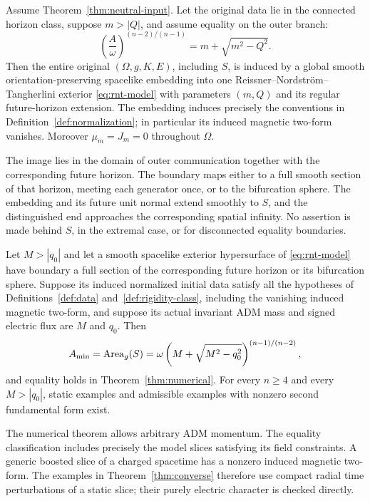 \begin{theorem}\label{thm:rigidity}
Assume Theorem~\ref{thm:neutral-input}. Let the original data lie in the connected horizon class, suppose $m>|Q|$, and assume equality on the outer branch:
\begin{equation}\label{eq:rigidity-equality}
 \left(\frac A\omega\right)^{(n-2)/(n-1)}
 =m+\sqrt{m^2-Q^2}.
\end{equation}
Then the entire original $(\Omega,g,K,E)$, including $S$, is induced by a global smooth orientation-preserving spacelike embedding into one Reissner--Nordstr\"om--Tangherlini exterior \eqref{eq:rnt-model} with parameters $(m,Q)$ and its regular future-horizon extension. The embedding induces precisely the conventions in Definition~\ref{def:normalization}; in particular its induced magnetic two-form vanishes. Moreover $\mu_m=J_m=0$ throughout $\Omega$.

The image lies in the domain of outer communication together with the corresponding future horizon. The boundary maps either to a full smooth section of that horizon, meeting each generator once, or to the bifurcation sphere. The embedding and its future unit normal extend smoothly to $S$, and the distinguished end approaches the corresponding spatial infinity. No assertion is made behind $S$, in the extremal case, or for disconnected equality boundaries.
\end{theorem}

\begin{theorem}\label{thm:converse}
Let $M>|q_0|$ and let a smooth spacelike exterior hypersurface of \eqref{eq:rnt-model} have boundary a full section of the corresponding future horizon or its bifurcation sphere. Suppose its induced normalized initial data satisfy all the hypotheses of Definitions~\ref{def:data} and~\ref{def:rigidity-class}, including the vanishing induced magnetic two-form, and suppose its actual invariant ADM mass and signed electric flux are $M$ and $q_0$. Then
\begin{equation}\label{eq:converse-area}
 A_{\min}=\operatorname{Area}_g(S)
 =\omega\left(M+\sqrt{M^2-q_0^2}\right)^{(n-1)/(n-2)},
\end{equation}
and equality holds in Theorem~\ref{thm:numerical}. For every $n\ge4$ and every $M>|q_0|$, static examples and admissible examples with nonzero second fundamental form exist.
\end{theorem}

\begin{remark}
The numerical theorem allows arbitrary ADM momentum. The equality classification includes precisely the model slices satisfying its field constraints. A generic boosted slice of a charged spacetime has a nonzero induced magnetic two-form. The examples in Theorem~\ref{thm:converse} therefore use compact radial time perturbations of a static slice; their purely electric character is checked directly.
\end{remark}

